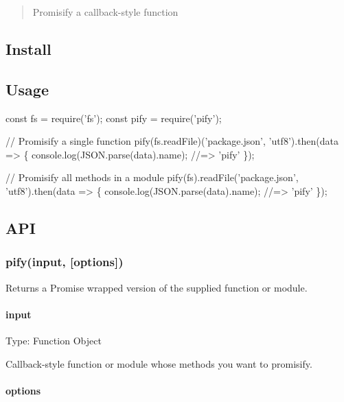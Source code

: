 \begin{quote}
Promisify a callback-\/style function \end{quote}


\subsection*{Install}




\subsection*{Usage}


\begin{DoxyCode}
const fs = require('fs');
const pify = require('pify');

// Promisify a single function
pify(fs.readFile)('package.json', 'utf8').then(data => \{
    console.log(JSON.parse(data).name);
    //=> 'pify'
\});

// Promisify all methods in a module
pify(fs).readFile('package.json', 'utf8').then(data => \{
    console.log(JSON.parse(data).name);
    //=> 'pify'
\});
\end{DoxyCode}


\subsection*{A\+PI}

\subsubsection*{pify(input, \mbox{[}options\mbox{]})}

Returns a {\ttfamily Promise} wrapped version of the supplied function or module.

\paragraph*{input}

Type\+: {\ttfamily Function} {\ttfamily Object}

Callback-\/style function or module whose methods you want to promisify.

\paragraph*{options}

